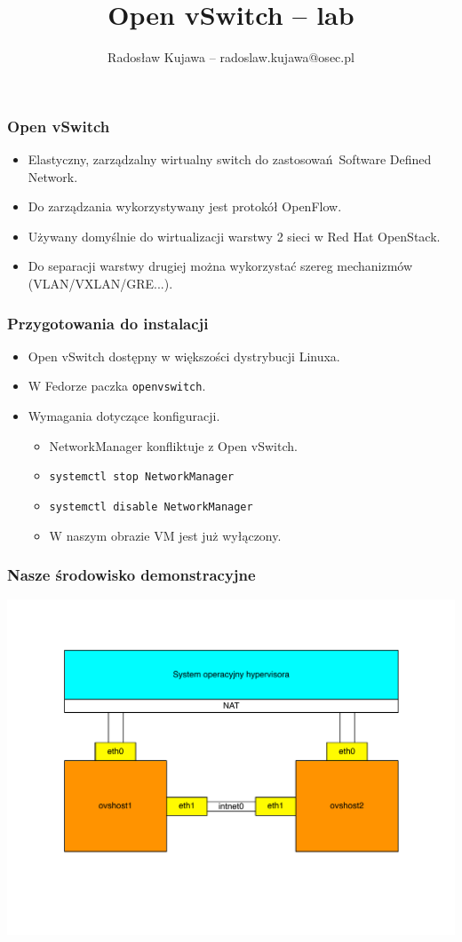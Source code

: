 \documentclass[dvipsnames,table]{beamer}
\title{Open vSwitch -- lab}
\author{Radosław Kujawa -- radoslaw.kujawa@osec.pl}
\institute{OSEC}
\begin{document}
\begin{frame}
	\titlepage
\end{frame}

\begin{frame}
\frametitle{Open vSwitch}
\begin{itemize}
	\item Elastyczny, zarządzalny wirtualny switch do zastosowań Software Defined Network.
	\item Do zarządzania wykorzystywany jest protokół OpenFlow.
	\item Używany domyślnie do wirtualizacji warstwy 2 sieci w Red Hat OpenStack.
	\item Do separacji warstwy drugiej można wykorzystać szereg mechanizmów (VLAN/VXLAN/GRE...).
\end{itemize}
\end{frame}

\begin{frame}
\frametitle{Przygotowania do instalacji}
\begin{itemize}
	\item Open vSwitch dostępny w większości dystrybucji Linuxa.
	\item W Fedorze paczka {\tt openvswitch}.
	\item Wymagania dotyczące konfiguracji.
	\begin{itemize}
		\item NetworkManager konfliktuje z Open vSwitch.
		\item {\tt systemctl stop NetworkManager}
		\item {\tt systemctl disable NetworkManager}
		\item W naszym obrazie VM jest już wyłączony.
	\end{itemize}
\end{itemize}
\end{frame}

\begin{frame}
\frametitle{Nasze środowisko demonstracyjne}
\includegraphics[width=1.00\textwidth]{img-labenv.pdf}
\end{frame}
\end{document}
